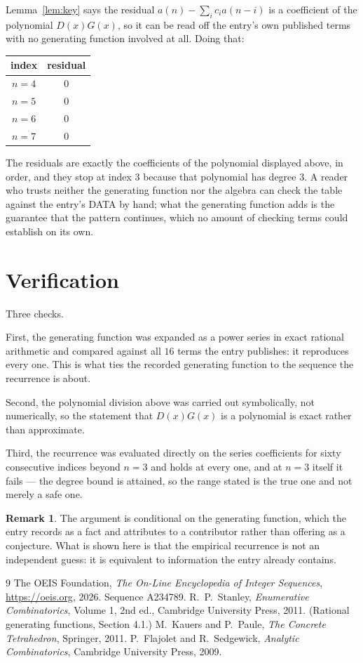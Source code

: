 \documentclass[11pt,a4paper]{article}
\theoremstyle{plain}
\theoremstyle{definition}
\newtheorem{remark}[theorem]{Remark}
\begin{document}
Lemma~\ref{lem:key} says the residual $a(n)-\sum_ic_ia(n-i)$ is a coefficient of the
polynomial $D(x)G(x)$, so it can be read off the entry's own published terms with no
generating function involved at all. Doing that:
\begin{center}
\begin{tabular}{cc}
index & residual \\ \hline
$n=4$ & $0$ \\
$n=5$ & $0$ \\
$n=6$ & $0$ \\
$n=7$ & $0$
\end{tabular}
\end{center}
The residuals are exactly the coefficients of the polynomial displayed above, in order, and
they stop at index $3$ because that polynomial has degree $3$. A reader who trusts
neither the generating function nor the algebra can check the table against the entry's DATA
by hand; what the generating function adds is the guarantee that the pattern continues, which
no amount of checking terms could establish on its own.

\section{Verification}

Three checks.

First, the generating function was expanded as a power series in exact rational arithmetic and
compared against all $16$ terms the entry publishes: it reproduces every one. This is
what ties the recorded generating function to the sequence the recurrence is about.

Second, the polynomial division above was carried out symbolically, not numerically, so the
statement that $D(x)G(x)$ is a polynomial is exact rather than approximate.

Third, the recurrence was evaluated directly on the series coefficients for sixty consecutive
indices beyond $n=3$ and holds at every one, and at $n=3$ itself it fails --- the
degree bound is attained, so the range stated is the true one and not merely a safe one.

\begin{remark}
The argument is conditional on the generating function, which the entry records as a fact and
attributes to a contributor rather than offering as a conjecture. What is shown here is that
the empirical recurrence is not an independent guess: it is equivalent to information the
entry already contains.
\end{remark}

\begin{thebibliography}{9}
 The OEIS Foundation, \emph{The On-Line Encyclopedia of Integer
Sequences}, \url{https://oeis.org}, 2026. Sequence A234789.
 R.~P.~Stanley, \emph{Enumerative Combinatorics}, Volume 1, 2nd ed.,
Cambridge University Press, 2011. (Rational generating functions, Section 4.1.)
 M.~Kauers and P.~Paule, \emph{The Concrete Tetrahedron}, Springer, 2011.
 P.~Flajolet and R.~Sedgewick, \emph{Analytic Combinatorics}, Cambridge
University Press, 2009.
\end{thebibliography}
\end{document}
